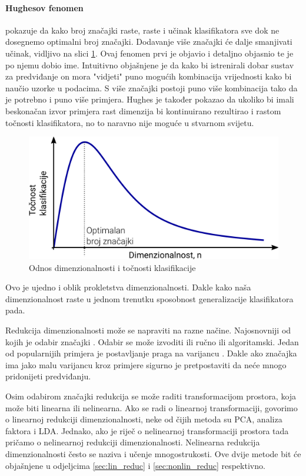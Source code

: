 \documentclass[times, utf8, diplomski]{fer}
\begin{document}
\paragraph{Hughesov fenomen}
pokazuje da kako broj značajki raste, raste i učinak klasifikatora sve dok ne dosegnemo optimalni broj značajki. Dodavanje više značajki će dalje smanjivati učinak, vidljivo na slici \ref{fig:hughes}. Ovaj fenomen prvi je objavio i detaljno objasnio \cite{hughes1968mean} te je po njemu dobio ime. Intuitivno objašnjene je da kako bi istrenirali dobar sustav za predviđanje on mora "vidjeti" puno mogućih kombinacija vrijednosti kako bi naučio uzorke u podacima. S više značajki postoji puno više kombinacija tako da je potrebno i puno više primjera. Hughes je također pokazao da ukoliko bi imali beskonačan izvor primjera rast dimenzija bi kontinuirano rezultirao i rastom točnosti klasifikatora, no to naravno nije moguće u stvarnom svijetu.
\begin{figure}[htb]
    \centering
    \includegraphics[width=12cm]{resources/images/reduction/hughes.png}
    \caption{Odnos dimenzionalnosti i točnosti klasifikacije}
    \label{fig:hughes}
\end{figure}

Ovo je ujedno i oblik prokletstva dimenzionalnosti. Dakle kako naša dimenzionalnost raste u jednom trenutku sposobnost generalizacije klasifikatora pada.

\bigskip
Redukcija dimenzionalnosti može se napraviti na razne načine. Najosnovniji od kojih je odabir značajki . Odabir se može izvoditi ili ručno ili algoritamski. Jedan od popularnijih primjera je postavljanje praga na varijancu . Dakle ako značajka ima jako malu varijancu kroz primjere sigurno je pretpostaviti da neće mnogo pridonijeti predviđanju.

\medskip
Osim odabirom značajki redukcija se može raditi transformacijom prostora, koja može biti linearna ili nelinearna. Ako se radi o linearnoj transformaciji, govorimo o linearnoj redukciji dimenzionalnosti, neke od čijih metoda su PCA, analiza faktora  i LDA. Jednako, ako je riječ o nelinearnoj transformaciji prostora tada pričamo o nelinearnoj redukciji dimenzionalnosti. Nelinearna redukcija dimenzionalnosti često se naziva i učenje mnogostrukosti. Ove dvije metode bit će objašnjene u odjeljcima \ref{sec:lin_reduc} i \ref{sec:nonlin_reduc} respektivno.
\end{document}

